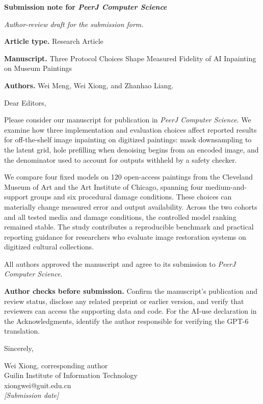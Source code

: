 \documentclass[11pt,a4paper]{article}
\begin{document}
{\Large\bfseries Submission note for \textit{PeerJ Computer Science}\par}
\medskip
\textit{Author-review draft for the submission form.}

\medskip
\textbf{Article type.} Research Article

\textbf{Manuscript.} Three Protocol Choices Shape Measured Fidelity of AI Inpainting on Museum Paintings

\textbf{Authors.} Wei Meng, Wei Xiong, and Zhanhao Liang.

Dear Editors,

Please consider our manuscript for publication in \textit{PeerJ Computer Science}. We examine how three implementation and evaluation choices affect reported results for off-the-shelf image inpainting on digitized paintings: mask downsampling to the latent grid, hole prefilling when denoising begins from an encoded image, and the denominator used to account for outputs withheld by a safety checker.

We compare four fixed models on 120 open-access paintings from the Cleveland Museum of Art and the Art Institute of Chicago, spanning four medium-and-support groups and six procedural damage conditions. These choices can materially change measured error and output availability. Across the two cohorts and all tested media and damage conditions, the controlled model ranking remained stable. The study contributes a reproducible benchmark and practical reporting guidance for researchers who evaluate image restoration systems on digitized cultural collections.

All authors approved the manuscript and agree to its submission to \textit{PeerJ Computer Science}.

\textbf{Author checks before submission.} Confirm the manuscript's publication and review status, disclose any related preprint or earlier version, and verify that reviewers can access the supporting data and code. For the AI-use declaration in the Acknowledgments, identify the author responsible for verifying the GPT-6 translation.

Sincerely,

Wei Xiong, corresponding author\\
Guilin Institute of Information Technology\\
xiongwei@guit.edu.cn\\
\textit{[Submission date]}
\end{document}
